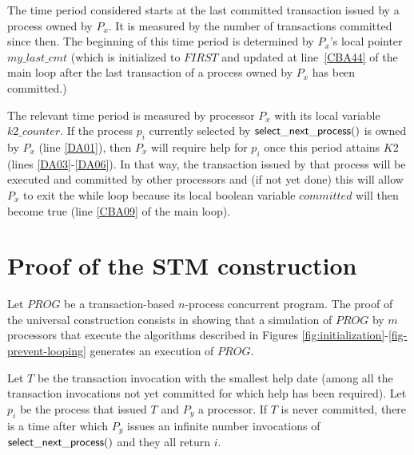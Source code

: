 The time period considered starts at the last committed transaction 
issued  by a  process owned  by $P_x$. It  is  measured by  the  number of
transactions committed since then.  The beginning of this time period is
determined by  $P_x$'s local pointer $my\_last\_cmt$  
(which   is initialized to $\mathit{FIRST}$
and updated at  line~\ref{CBA44} of the main loop after the last transaction
of a process  owned by $P_x$  has been committed.) 


The relevant time period is measured by processor $P_x$ with  its local 
variable  $k2\_counter$.  If the process $p_i$ currently selected by 
${\sf select\_next\_process}()$ is owned by $P_x$ (line \ref{DA01}),
then $P_x$ will require help for $p_i$ once this period attains $K2$
(lines \ref{DA03}-\ref{DA06}). In that way, the transaction 
issued by that process will be executed and committed by other processors
and (if not yet done) this will  allow $P_x$ to exit the while loop because
its  local  boolean   variable  $committed$  will then  become  true  (line
\ref{CBA09} of  the main loop).  


\section{Proof of the STM  construction}
\label{sec:proof}

Let $\mathit{PROG}$ be a transaction-based $n$-process concurrent program. 
The proof of the universal construction consists in showing that a  
simulation of $\mathit{PROG}$ by $m$ processors that execute the algorithms 
described in Figures \ref{fig:initialization}-\ref{fig-prevent-looping}
generates an execution of  $\mathit{PROG}$. 



\begin{lemma}
\label{lemma:help-commit-1}

Let $T$ be the  transaction invocation  with  the smallest help date
(among all the transaction invocations not yet committed
for which help has been required). Let $p_i$ be the process that issued $T$
and $P_y$ a processor.
If $T$ is never committed, there is a time after which $P_y$ issues an 
infinite number invocations of ${\sf select\_next\_process}()$ 
and they all return $i$. 
\end{lemma}

